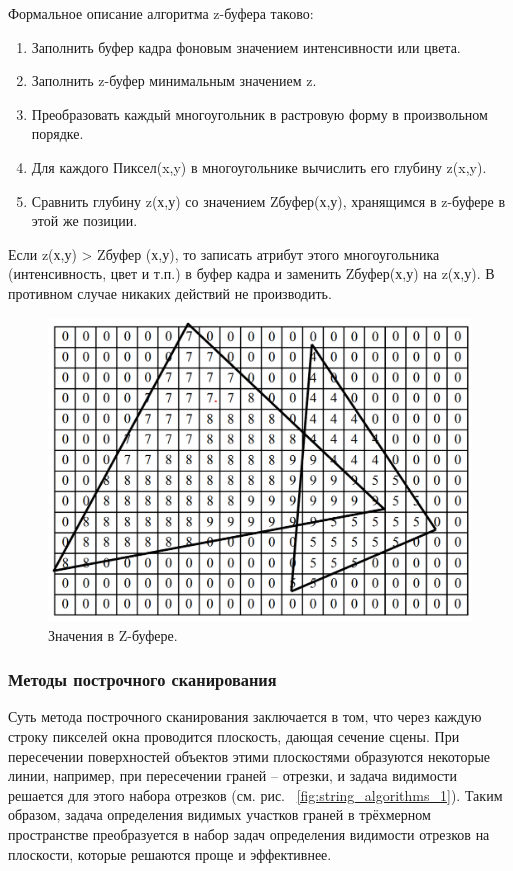 Формальное описание алгоритма z-буфера таково:

\begin{enumerate}
\item Заполнить буфер кадра фоновым значением интенсивности или цвета.
\item Заполнить z-буфер минимальным значением z.
\item Преобразовать каждый многоугольник в растровую форму в произвольном порядке.
\item Для каждого Пиксел(x,y) в многоугольнике вычислить его глубину z(x,y).
\item Сравнить глубину z(х,у) со значением Zбуфер(х,у), хранящимся в z-буфере в этой же позиции.
\end{enumerate}

Если z(х,у) > Zбуфер (х,у), то записать атрибут этого многоугольника (интенсивность, цвет и т.п.) в буфер кадра и заменить Zбуфер(х,у) на z(х,у). В противном случае никаких действий не производить.~\cite{zbuffer}

\begin{figure}[H]
    \centering
    \includegraphics[width=\textwidth]{img/Zbuff_algorithm_1.png}
    \caption{Значения в Z-буфере.}
    \label{fig:Zbuff_algorithm_1}
\end{figure}



\subsubsection{Методы построчного сканирования}

\hspace{1.25cm}
Суть метода построчного сканирования заключается в том,
что через каждую строку пикселей окна проводится плоскость, дающая сечение сцены. При пересечении поверхностей объектов этими плоскостями
образуются некоторые линии, например, при пересечении граней – отрезки, и задача видимости решается для этого набора отрезков (см. рис. ~\ref{fig:string_algorithms_1}). Таким образом, задача определения видимых участков граней в трёхмерном пространстве преобразуется в набор задач определения видимости отрезков на плоскости, которые решаются проще и эффективнее. 

